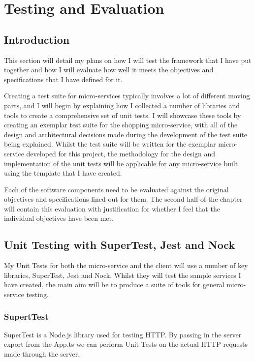 \chapter{Testing and Evaluation}
\section{Introduction}

This section will detail my plans on how I will test the framework that I have put together and how I will evaluate how well it meets the objectives and specifications that I have defined for it. 

Creating a test suite for micro-services typically involves a lot of different moving parts, and I will begin by explaining how I collected a number of libraries and tools to create a comprehensive set of unit tests. I will showcase these tools by creating an exemplar test suite for the shopping micro-service, with all of the design and architectural decisions made during the development of the test suite being explained. Whilst the test suite will be written for the exemplar micro-service developed for this project, the methodology for the design and implementation of the unit tests will be applicable for any micro-service built using the template that I have created.


Each of the software components need to be evaluated against the original objectives and specifications lined out for them. The second half of the chapter will contain this evaluation with justification for whether I feel that the individual objectives have been met.


\section{Unit Testing with SuperTest, Jest and Nock}

My Unit Tests for both the micro-service and the client will use a number of key libraries, SuperTest, Jest and Nock. Whilst they will test the sample services I have created, the main aim will be to produce a suite of tools for general micro-service testing.
\subsection{SupertTest}
SuperTest is a Node.js library used for testing HTTP. By passing in the server export from the App.ts we can perform Unit Tests on the actual HTTP requests made through the server.

